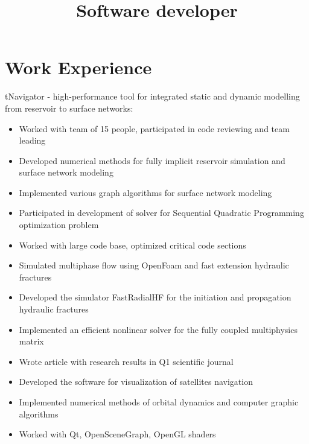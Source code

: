 \documentclass[10pt,a4paper]{moderncv}
\title{Software developer}
\begin{document}
\maketitle

\section{Work Experience}

{tNavigator - high-performance tool for integrated static and dynamic modelling from reservoir to surface networks:
  \begin{itemize}
  \item Worked with team of 15 people, participated in code reviewing and team leading
  \item Developed numerical methods for fully implicit reservoir simulation and surface network modeling
  \item Implemented various graph algorithms for surface network modeling
  \item Participated in development of solver for Sequential Quadratic Programming optimization problem
  \item Worked with large code base, optimized critical code sections 
  \end{itemize}
}

{
\begin{itemize}
 \item Simulated multiphase flow using OpenFoam and fast extension hydraulic fractures
 \item Developed the simulator FastRadialHF for the initiation and propagation hydraulic fractures
 \item Implemented an efficient nonlinear solver for the fully coupled multiphysics matrix
 \item Wrote article with research results in Q1 scientific journal 
\end{itemize}
}

{
\begin{itemize}
 \item Developed the software for visualization of satellites navigation
 \item Implemented numerical methods of orbital dynamics and computer graphic algorithms
 \item Worked with Qt, OpenSceneGraph, OpenGL shaders
\end{itemize}
}
\end{document}

